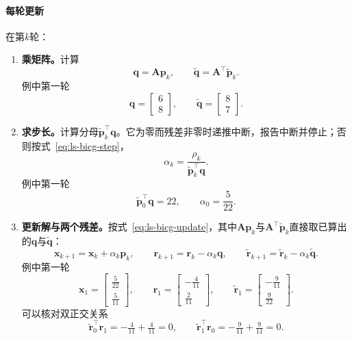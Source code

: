 \paragraph{每轮更新}
在第$k$轮：
\begin{enumerate}
 \item \textbf{乘矩阵。}计算
 \[
  \bm q=\bm A\bm p_k,\qquad \widetilde{\bm q}=\bm A^\top\widetilde{\bm p}_k .
 \]
 例中第一轮
 \[
  \bm q=\begin{bmatrix}6\\8\end{bmatrix},\qquad
  \widetilde{\bm q}=\begin{bmatrix}8\\7\end{bmatrix}.
 \]

 \item \textbf{求步长。}计算分母$\widetilde{\bm p}_k^\top\bm q$。它为零而残差非零时递推中断，报告中断并停止；否则按式~\eqref{eq:ls-bicg-step}，
 \[
  \alpha_k=\frac{\rho_k}{\widetilde{\bm p}_k^\top\bm q} .
 \]
 例中第一轮
 \[
  \widetilde{\bm p}_0^\top\bm q=22,\qquad \alpha_0=\frac5{22}.
 \]

 \item \textbf{更新解与两个残差。}按式~\eqref{eq:ls-bicg-update}，其中$\bm A\bm p_k$与$\bm A^\top\widetilde{\bm p}_k$直接取已算出的$\bm q$与$\widetilde{\bm q}$：
 \[
  \bm x_{k+1}=\bm x_k+\alpha_k\bm p_k,\qquad
  \bm r_{k+1}=\bm r_k-\alpha_k\bm q,\qquad
  \widetilde{\bm r}_{k+1}=\widetilde{\bm r}_k-\alpha_k\widetilde{\bm q} .
 \]
 例中第一轮
 \[
  \bm x_1=\begin{bmatrix}\tfrac5{22}\\\tfrac5{11}\end{bmatrix},\qquad
  \bm r_1=\begin{bmatrix}-\tfrac4{11}\\\tfrac2{11}\end{bmatrix},\qquad
  \widetilde{\bm r}_1=\begin{bmatrix}-\tfrac9{11}\\\tfrac9{22}\end{bmatrix}.
 \]
 可以核对双正交关系
 \[
  \widetilde{\bm r}_0^\top\bm r_1=-\tfrac4{11}+\tfrac4{11}=0,\qquad
  \widetilde{\bm r}_1^\top\bm r_0=-\tfrac9{11}+\tfrac9{11}=0 .
 \]


\end{enumerate}
